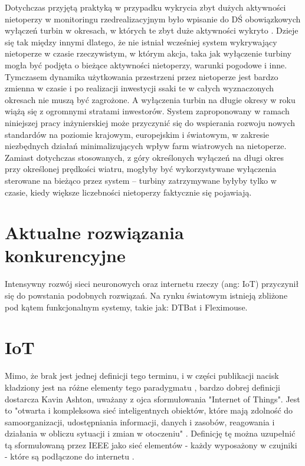 \documentclass{sprz}
\begin{document}
Dotychczas przyjętą praktyką w przypadku wykrycia zbyt dużych aktywności nietoperzy w monitoringu rzedrealizacyjnym było wpisanie do DŚ obowiązkowych wyłączeń turbin w okresach, w których te zbyt duże aktywności wykryto \cite{Wytyczne}. Dzieje się tak między innymi dlatego, że nie istniał wcześniej system wykrywający nietoperze w czasie rzeczywistym, w którym akcja, taka jak wyłączenie turbiny mogła być podjęta o bieżące aktywności nietoperzy, warunki pogodowe i inne. Tymczasem dynamika użytkowania przestrzeni przez nietoperze jest bardzo zmienna w czasie i po realizacji inwestycji ssaki te w całych wyznaczonych okresach nie muszą być zagrożone. A wyłączenia turbin na długie okresy w roku wiążą się z ogromnymi stratami inwestorów. System zaproponowany w ramach niniejszej pracy inżynierskiej może przyczynić się do wspierania rozwoju nowych standardów na poziomie krajowym, europejskim i światowym, w zakresie niezbędnych działań minimalizujących wpływ farm wiatrowych na nietoperze. Zamiast dotychczas stosowanych, z góry określonych wyłączeń na długi okres przy określonej prędkości wiatru, mogłyby być wykorzystywane wyłączenia sterowane na bieżąco przez system – turbiny 
zatrzymywane byłyby tylko w czasie, kiedy większe liczebności nietoperzy 
faktycznie się pojawiają.

\section{Aktualne rozwiązania konkurencyjne}

Intensywny rozwój sieci neuronowych oraz internetu rzeczy (ang: IoT) przyczynił się do powstania podobnych rozwiązań. Na rynku światowym istnieją zbliżone pod kątem funkcjonalnym systemy, takie jak: DTBat i Fleximouse.

\section{IoT}

Mimo, że brak jest jednej definicji tego terminu, 
i w części publikacji nacisk kładziony jest na różne elementy tego 
paradygmatu \cite{iot-gov}, bardzo dobrej definicji dostarcza Kavin Ashton, 
uważany z ojca sformułowania "Internet of Things". Jest to "otwarta i 
kompleksowa sieć inteligentnych obiektów, które mają zdolność do 
samoorganizacji, udostępniania 
informacji, danych i zasobów, reagowania i działania w obliczu sytuacji
i zmian w otoczeniu" \cite{Ashton2002}. Definicję tę można uzupełnić tą 
sformułowaną przez IEEE jako sieć elementów - każdy wyposażony w czujniki - 
które są podłączone do internetu \cite{IEEE-iot}.
\end{document}
